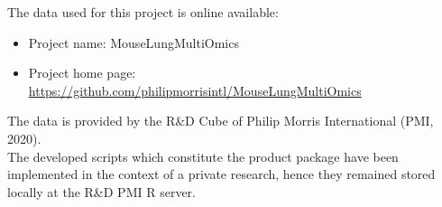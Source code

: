 The data used for this project is online available:
\begin{itemize}
    \item Project name: MouseLungMultiOmics
    \item Project home page: \url{https://github.com/philipmorrisintl/MouseLungMultiOmics}
\end{itemize}

The data is provided by the R\&D Cube of Philip Morris International (PMI, 2020).
\\

The developed scripts which constitute the product package have been  implemented in the context of a private research, hence they remained stored locally at the R\&D PMI R server.
\\